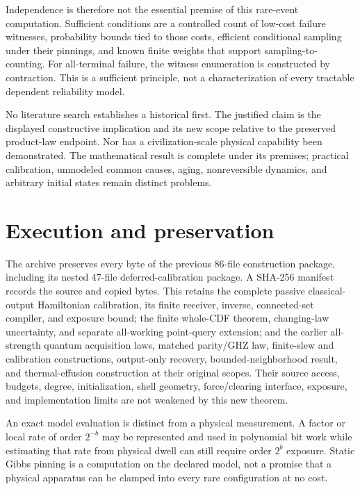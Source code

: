 \documentclass[11pt]{article}
\begin{document}
Independence is therefore not the essential premise of this rare-event computation. Sufficient conditions are a controlled count of low-cost failure witnesses, probability bounds tied to those costs, efficient conditional sampling under their pinnings, and known finite weights that support sampling-to-counting. For all-terminal failure, the witness enumeration is constructed by contraction. This is a sufficient principle, not a characterization of every tractable dependent reliability model.

No literature search establishes a historical first. The justified claim is the displayed constructive implication and its new scope relative to the preserved product-law endpoint. Nor has a civilization-scale physical capability been demonstrated. The mathematical result is complete under its premises; practical calibration, unmodeled common causes, aging, nonreversible dynamics, and arbitrary initial states remain distinct problems.

\section{Execution and preservation}
\label{sec:evidence}


The archive preserves every byte of the previous 86-file construction package, including its nested 47-file deferred-calibration package. A SHA-256 manifest records the source and copied bytes. This retains the complete passive classical-output Hamiltonian calibration, its finite receiver, inverse, connected-set compiler, and exposure bound; the finite whole-CDF theorem, changing-law uncertainty, and separate all-working point-query extension; and the earlier all-strength quantum acquisition laws, matched parity/GHZ law, finite-slew and calibration constructions, output-only recovery, bounded-neighborhood result, and thermal-effusion construction at their original scopes. Their source access, budgets, degree, initialization, shell geometry, force/clearing interface, exposure, and implementation limits are not weakened by this new theorem.

An exact model evaluation is distinct from a physical measurement. A factor or local rate of order $2^{-b}$ may be represented and used in polynomial bit work while estimating that rate from physical dwell can still require order $2^b$ exposure. Static Gibbs pinning is a computation on the declared model, not a promise that a physical apparatus can be clamped into every rare configuration at no cost.
\end{document}
